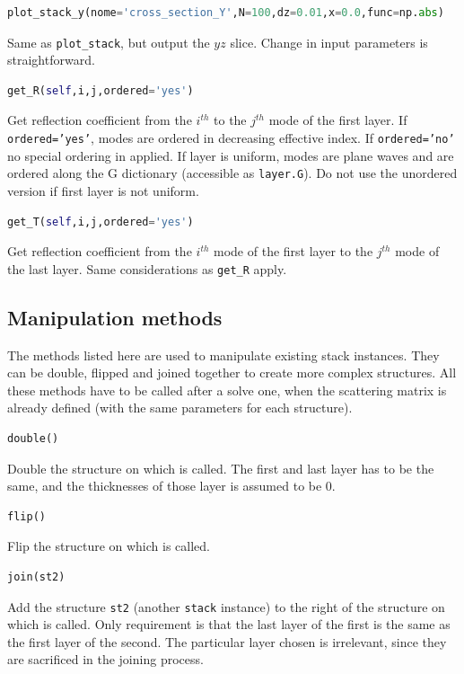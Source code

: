 \documentclass[a4paper,10pt]{report}
\begin{document}
\begin{lstlisting}[language=Python,basicstyle=\ttfamily\small]
plot_stack_y(nome='cross_section_Y',N=100,dz=0.01,x=0.0,func=np.abs)
\end{lstlisting}
Same as \texttt{plot\_stack}, but output the $yz$ slice. Change in input parameters is straightforward. 

\begin{lstlisting}[language=Python,basicstyle=\ttfamily\small]
get_R(self,i,j,ordered='yes')
\end{lstlisting}
Get reflection coefficient from the $i^{th}$ to the $j^{th}$ mode of the first layer. If \texttt{ordered='yes'}, modes are ordered in decreasing effective index. If \texttt{ordered='no'} no special ordering in applied. If layer is uniform, modes are plane waves and are ordered along the G dictionary (accessible as \texttt{layer.G}). Do not use the unordered version if first layer is not uniform. 

\begin{lstlisting}[language=Python,basicstyle=\ttfamily\small]
get_T(self,i,j,ordered='yes')
\end{lstlisting}
Get reflection coefficient from the $i^{th}$ mode of the first layer to the $j^{th}$ mode of the last layer. Same considerations as \texttt{get\_R} apply. 

\subsection{Manipulation methods}
The methods listed here are used to manipulate existing stack instances. They can be double, flipped and joined together to create more complex structures. All these methods have to be called after a solve one, when the scattering matrix is already defined (with the same parameters for each structure).

\begin{lstlisting}[language=Python,basicstyle=\ttfamily\small]
double()
\end{lstlisting}
Double the structure on which is called. The first and last layer has to be the same, and the thicknesses of those layer is assumed to be 0.

\begin{lstlisting}[language=Python,basicstyle=\ttfamily\small]
flip()
\end{lstlisting}
Flip the structure on which is called. 

\begin{lstlisting}[language=Python,basicstyle=\ttfamily\small]
join(st2)
\end{lstlisting}
Add the structure \texttt{st2} (another \texttt{stack} instance) to the right of the structure on which is called. Only requirement is that the last layer of the first is the same as the first layer of the second. The particular layer chosen is irrelevant, since they are sacrificed in the joining process. 
\end{document}
